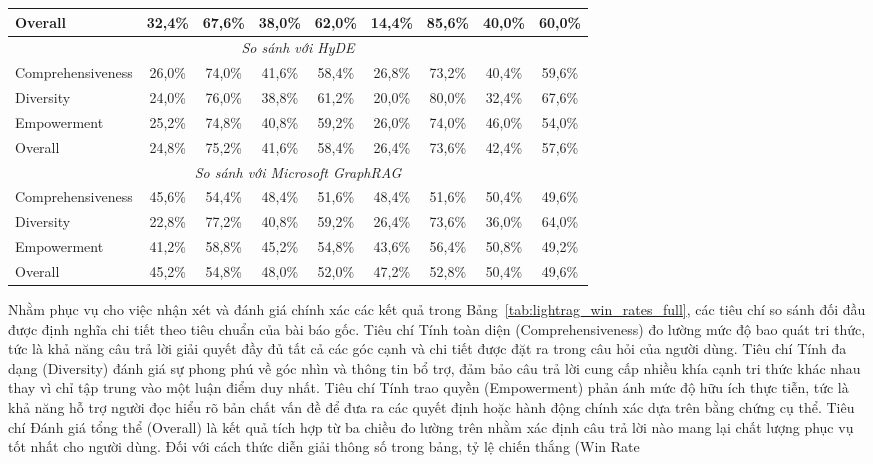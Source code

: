 \begin{table}[H]
{\begin{tabular}{|l|cc|cc|cc|cc|}
		Overall & 32,4\% & 67,6\% & 38,0\% & 62,0\% & 14,4\% & 85,6\% & 40,0\% & 60,0\% \\ \hline
		\multicolumn{9}{|c|}{\textit{So sánh với HyDE}} \\ \hline
		Comprehensiveness & 26,0\% & 74,0\% & 41,6\% & 58,4\% & 26,8\% & 73,2\% & 40,4\% & 59,6\% \\
		Diversity & 24,0\% & 76,0\% & 38,8\% & 61,2\% & 20,0\% & 80,0\% & 32,4\% & 67,6\% \\
		Empowerment & 25,2\% & 74,8\% & 40,8\% & 59,2\% & 26,0\% & 74,0\% & 46,0\% & 54,0\% \\
		Overall & 24,8\% & 75,2\% & 41,6\% & 58,4\% & 26,4\% & 73,6\% & 42,4\% & 57,6\% \\ \hline
		\multicolumn{9}{|c|}{\textit{So sánh với Microsoft GraphRAG}} \\ \hline
		Comprehensiveness & 45,6\% & 54,4\% & 48,4\% & 51,6\% & 48,4\% & 51,6\% & 50,4\% & 49,6\% \\
		Diversity & 22,8\% & 77,2\% & 40,8\% & 59,2\% & 26,4\% & 73,6\% & 36,0\% & 64,0\% \\
		Empowerment & 41,2\% & 58,8\% & 45,2\% & 54,8\% & 43,6\% & 56,4\% & 50,8\% & 49,2\% \\
		Overall & 45,2\% & 54,8\% & 48,0\% & 52,0\% & 47,2\% & 52,8\% & 50,4\% & 49,6\% \\ \hline
	\end{tabular}%
	}
\end{table}

\indent Nhằm phục vụ cho việc nhận xét và đánh giá chính xác các kết quả trong Bảng~\ref{tab:lightrag_win_rates_full}, các tiêu chí so sánh đối đầu được định nghĩa chi tiết theo tiêu chuẩn của bài báo gốc. Tiêu chí Tính toàn diện (Comprehensiveness) đo lường mức độ bao quát tri thức, tức là khả năng câu trả lời giải quyết đầy đủ tất cả các góc cạnh và chi tiết được đặt ra trong câu hỏi của người dùng. Tiêu chí Tính đa dạng (Diversity) đánh giá sự phong phú về góc nhìn và thông tin bổ trợ, đảm bảo câu trả lời cung cấp nhiều khía cạnh tri thức khác nhau thay vì chỉ tập trung vào một luận điểm duy nhất. Tiêu chí Tính trao quyền (Empowerment) phản ánh mức độ hữu ích thực tiễn, tức là khả năng hỗ trợ người đọc hiểu rõ bản chất vấn đề để đưa ra các quyết định hoặc hành động chính xác dựa trên bằng chứng cụ thể. Tiêu chí Đánh giá tổng thể (Overall) là kết quả tích hợp từ ba chiều đo lường trên nhằm xác định câu trả lời nào mang lại chất lượng phục vụ tốt nhất cho người dùng. Đối với cách thức diễn giải thông số trong bảng, tỷ lệ chiến thắng (Win Rate %

